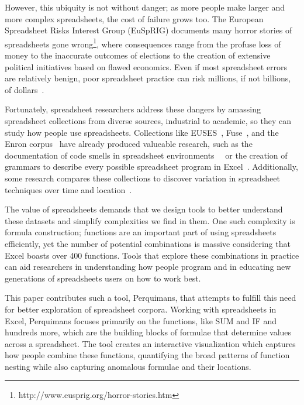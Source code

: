 \documentclass[conference]{IEEEtran}
\newcommand{\toolname}{Perquimans\xspace} \newcommand{\toolnameend}{Perquimans}
\begin{document}
	However, this ubiquity is not without danger; as more people make larger and
	more complex spreadsheets, the cost of failure grows too. The European
	Spreadsheet Risks Interest Group (EuSpRIG) documents many horror stories of
	spreadsheets gone wrong\footnote{http://www.eusprig.org/horror-stories.htm},
	where consequences range from the profuse loss of money to the inaccurate
	outcomes of elections to the creation of extensive political initiatives based
	on flawed economics. Even if most spreadsheet errors are relatively benign,
	poor spreadsheet practice can risk millions, if not billions, of
	dollars~\cite{powell2009impact}.
	
	Fortunately, spreadsheet researchers address these dangers by amassing
	spreadsheet collections from diverse sources, industrial to academic, so
	they can study how people use spreadsheets. Collections like
	EUSES~\cite{fisher2005euses}, Fuse~\cite{barik2015fuse}, and the Enron
	corpus~\cite{hermans2015enron} have already produced valueable research, such
	as the documentation of code smells in spreadsheet
	environments~\cite{hermans2012detecting}~\cite{jansen2015code} or the creation
	of grammars to describe every possible spreadsheet program in
	Excel~\cite{aivaloglou2015grammar}. Additionally, some research compares these
	collections to discover variation in spreadsheet techniques over time and
	location~\cite{jansen2015enron}.
	
	The value of spreadsheets demands that we design tools to better understand
	these datasets and simplify complexities we find in them. One such complexity
	is formula construction; functions are an important part of using spreadsheets
	efficiently, yet the number of potential combinations is massive considering
	that Excel boasts over 400 functions. Tools that explore these combinations in
	practice can aid researchers in understanding how people program and in
	educating new generations of spreadsheets users on how to work best.
	
	This paper contributes such a tool, \toolnameend, that attempts to fulfill this
	need for better exploration of spreadsheet corpora. Working with spreadsheets
	in Excel, \toolname focuses primarily on the functions, like SUM and IF and
	hundreds more, which are the building blocks of formulae that determine values
	across a spreadsheet. The tool creates an interactive visualization which
	captures how people combine these functions, quantifying the broad patterns of
	function nesting while also capturing anomalous formulae and their locations.
	
\end{document}
